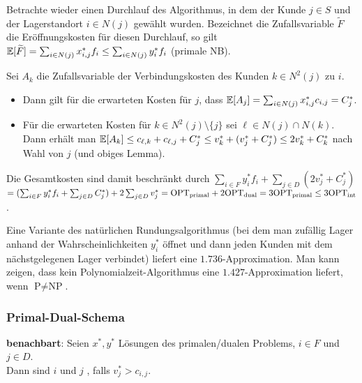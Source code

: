 \begin{Beweis}
    Betrachte wieder einen Durchlauf des Algorithmus, in dem der Kunde $j \in S$
    und der Lagerstandort $i \in N(j)$ gewählt wurden.
    Bezeichnet die Zufallsvariable $\widetilde{F}$
    die Eröffnungskosten für diesen Durchlauf, so gilt
    $\mathbb{E}[\widetilde{F}] = \sum_{i \in N(j)} x_{i,j}^\ast f_i \le \sum_{i \in N(j)} y_i^\ast f_i$
    (primale NB).
    
    Sei $A_k$ die Zufallsvariable der Verbindungskosten des Kunden $k \in N^2(j)$ zu $i$.
    \begin{itemize}
        \item
        Dann gilt für die erwarteten Kosten für $j$, dass
        $\mathbb{E}[A_j] = \sum_{i \in N(j)} x_{i,j}^\ast c_{i,j} = C_j^\ast$.
        
        \item
        Für die erwarteten Kosten für $k \in N^2(j) \setminus \{j\}$
        sei $\ell \in N(j) \cap N(k)$.
        Dann erhält man
        $\mathbb{E}[A_k] \le c_{\ell,k} + c_{\ell,j} + C_j^\ast \le
        v_k^\ast + (v_j^\ast + C_j^\ast) \le 2v_k^\ast + C_k^\ast$
        nach Wahl von $j$ (und obiges Lemma).
    \end{itemize}
    
    Die Gesamtkosten sind damit beschränkt durch
    $\sum_{i \in F} y_i^\ast f_i + \sum_{j \in D} (2v_j^\ast + C_j^\ast)$\\
    $= (\sum_{i \in F} y_i^\ast f_i + \sum_{j \in D} C_j^\ast) + 2\sum_{j \in D} v_j^\ast
    = \text{OPT}_\text{primal} + 2\text{OPT}_\text{dual} = 3\text{OPT}_\text{primal} \le 3\text{OPT}_\text{int}$.
\end{Beweis}

\linie

Eine Variante des natürlichen Rundungsalgorithmus
(bei dem man zufällig Lager anhand der Wahrscheinlichkeiten $y_i^\ast$ öffnet und dann
jeden Kunden mit dem nächstgelegenen Lager verbindet)
liefert eine $1.736$-Approximation.
Man kann zeigen, dass kein Polynomialzeit-Algorithmus eine $1.427$-Approximation liefert,
wenn $\text{P} \not= \text{NP}$.

\pagebreak

\subsubsection{%
    Primal-Dual-Schema%
}

\textbf{benachbart}:
Seien $x^\ast, y^\ast$ Lösungen des primalen/dualen Problems, $i \in F$ und $j \in D$.\\
Dann sind $i$ und $j$ , falls $v_j^\ast > c_{i,j}$.

